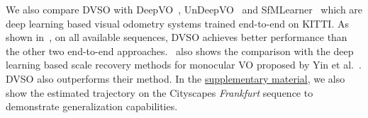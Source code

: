 \documentclass[runningheads]{llncs}
\begin{document}
We also compare DVSO with DeepVO~\cite{wang2017deepvo}, UnDeepVO~\cite{li2017undeepvo} 
and SfMLearner~\cite{zhou2017unsupervised} which are  
deep learning based visual odometry systems trained end-to-end on KITTI. As shown 
in~, on all available sequences, DVSO achieves better performance than the other two end-to-end 
approaches.~ also shows the comparison 
with the deep learning based scale recovery methods for monocular VO proposed by 
Yin et al.~\cite{yin2017scale}. DVSO also outperforms their method.
In the 
\href{https://vision.in.tum.de/_media/spezial/bib/yang2018dvso-supp.pdf}{supplementary
	material}, we also show the estimated trajectory on the 
Cityscapes \textit{Frankfurt} sequence to demonstrate generalization 
capabilities.

\end{document}

